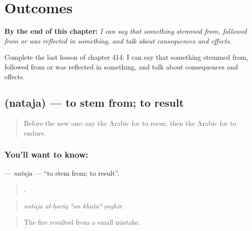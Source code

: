
\chapter{Outcomes}
\label{ch:ar-outcomes}

\begin{chapteropening}
\textbf{By the end of this chapter:} \emph{I can say that something stemmed from, followed from or was reflected in something, and talk about consequences and effects.}

Complete the last lesson of chapter 414: I can say that something stemmed from, followed from or was reflected in something, and talk about consequences and effects.
\end{chapteropening}

\section[\texorpdfstring{\ar{نتج} (nataja)}{نتج (nataja)}]{ (nataja) — to stem from; to result}

\label{lesson:AR-C414-nataja}



\begin{quote}
Before the new one: say the Arabic for to recur, then the Arabic for to endure.
\end{quote}

\subsection*{You'll want to know: }
\textbf{} — \emph{nataja} — \textquotedblleft{}to stem from; to result\textquotedblright{}.

\begin{quote}
    .
\end{quote}

\begin{quote}
\emph{nataja al-ḥarīq ʿan khaṭaʾ ṣaghīr.}
\end{quote}

\begin{quote}
The fire resulted from a small mistake.
\end{quote}

